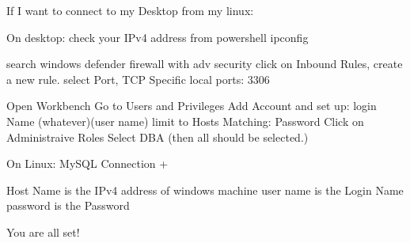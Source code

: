 If I want to connect to my Desktop from my linux:

		On desktop:
				check your IPv4 address from powershell
						ipconfig

				search windows defender firewall with adv security
				click on Inbound Rules, create a new rule.
						select Port,
								TCP
								Specific local ports: 3306


				Open Workbench
						Go to Users and Privileges
						Add Account and set up:
								login Name (whatever)(user name)
								limit to Hosts Matching: %
								Password
						Click on Administraive Roles
								Select DBA (then all should be selected.)




		On Linux:
				MySQL Connection +

						Host Name is the IPv4 address of windows machine
						user name is the Login Name
						password is the Password


You are all set!
